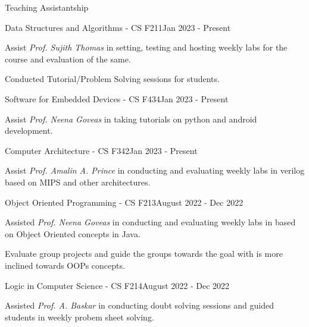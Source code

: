 
\begin{rSection}{Teaching Assistantship}

    \begin{rSubsection}{Data Structures and Algorithms - CS F211}{Jan 2023 - Present}{}{}
    \item Assist \textit{Prof. Sujith Thomas} in setting, testing and hosting weekly labs for the course and evaluation of the same.
    \item Conducted Tutorial/Problem Solving sessions for students.
    \end{rSubsection}

    \begin{rSubsection}{Software for Embedded Devices - CS F434}{Jan 2023 - Present}{}{}
    \item Assist \textit{Prof. Neena Goveas} in taking tutorials on python and android development.
    \end{rSubsection}

    \begin{rSubsection}{Computer Architecture - CS F342}{Jan 2023 - Present}{}{}
    \item Assist \textit{Prof. Amalin A. Prince} in conducting and evaluating weekly labs in verilog based on MIPS and other architectures. 
    \end{rSubsection}

    \begin{rSubsection}{Object Oriented Programming - CS F213}{August 2022 - Dec 2022}{}{}
    \item Assisted \textit{Prof. Neena Goveas} in conducting and evaluating weekly labs in based on Object Oriented concepts in Java. 
    \item Evaluate group projects and guide the groups towards the goal with is more inclined towards OOPs concepts.
    \end{rSubsection}

    \begin{rSubsection}{Logic in Computer Science - CS F214}{August 2022 - Dec 2022}{}{}
    \item Assisted \textit{Prof. A. Baskar} in conducting doubt solving sessions and guided students in weekly probem sheet solving.
    \end{rSubsection}

\end{rSection}